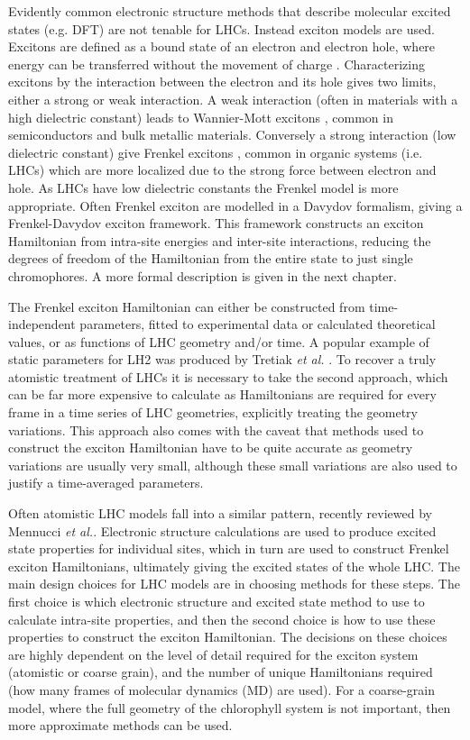 Evidently common electronic structure methods that describe molecular excited states
(e.g. DFT) are not tenable for LHCs. Instead exciton models are used. Excitons are 
defined as a bound state of an electron and electron hole, where energy can be transferred
without the movement of charge \cite{Craig1968, Scholes2006}. Characterizing excitons
by the interaction between the electron and its hole gives two limits, either a strong 
or weak interaction. A weak interaction (often in materials with a high dielectric
constant) leads to Wannier-Mott excitons \cite{Wannier1937}, common in semiconductors
and bulk metallic materials. Conversely a strong interaction (low dielectric constant) 
give Frenkel excitons \cite{Frenkel1931}, common in organic systems (i.e. LHCs)
which are more localized due to the strong force between electron and hole. As LHCs
have low dielectric constants the Frenkel model is more appropriate. Often Frenkel
exciton are modelled in a Davydov formalism, giving a Frenkel-Davydov exciton framework\cite{Davydov1964}.
This framework constructs an exciton Hamiltonian from intra-site energies and inter-site
interactions, reducing the degrees of freedom of the Hamiltonian from the entire
state to just single chromophores. A more formal description is given in the next 
chapter.

The Frenkel exciton Hamiltonian can either be constructed from time-independent
parameters, fitted to experimental data or calculated theoretical values, or as 
functions of LHC geometry and/or time. A popular example of static parameters for 
LH2 was produced by Tretiak \emph{et al.} \cite{Tretiak2000}. To recover a truly 
atomistic treatment of LHCs it is necessary to take the second approach, which can
be far more expensive to calculate as Hamiltonians are required for every frame 
in a time series of LHC geometries, explicitly treating the geometry variations.
This approach also comes with the caveat that methods used to construct the exciton
Hamiltonian have to be quite accurate as geometry variations are usually very small,
although these small variations are also used to justify a time-averaged parameters.

Often atomistic LHC models fall into a similar pattern, recently reviewed by Mennucci 
\emph{et al.}\cite{Cignoni2022}. Electronic structure calculations are used to
produce excited state properties for individual sites, which in turn are used to
construct Frenkel exciton Hamiltonians, ultimately giving the excited states of
the whole LHC. The main design choices for LHC models are in choosing methods for
these steps. The first choice is which electronic structure and excited state method 
to use to calculate intra-site properties, and then the second choice is how to 
use these properties to construct the exciton Hamiltonian. The decisions on these
choices are highly dependent on the level of detail required for the exciton system
(atomistic or coarse grain), and the number of unique Hamiltonians required (how 
many frames of molecular dynamics (MD) are used). For a coarse-grain model, where
the full geometry of the chlorophyll system is not important, then more approximate 
methods can be used.

